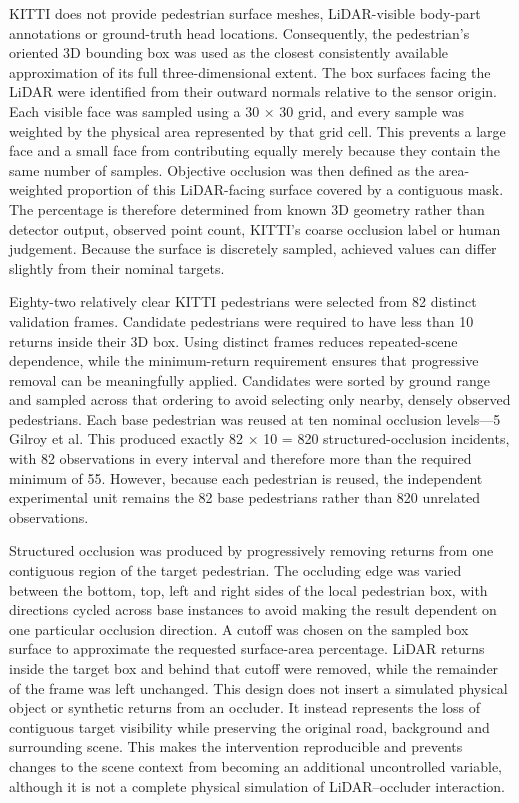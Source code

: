  KITTI does not provide pedestrian surface meshes, LiDAR-visible body-part annotations or ground-truth head
 locations. Consequently, the pedestrian’s oriented 3D bounding box was used as the closest consistently available
 approximation of its full three-dimensional extent. The box surfaces facing the LiDAR were identified from their
 outward normals relative to the sensor origin. Each visible face was sampled using a 30 × 30 grid, and every sample
 was weighted by the physical area represented by that grid cell. This prevents a large face and a small face from
 contributing equally merely because they contain the same number of samples. Objective occlusion was then defined as
 the area-weighted proportion of this LiDAR-facing surface covered by a contiguous mask. The percentage is therefore
 determined from known 3D geometry rather than detector output, observed point count, KITTI’s coarse occlusion label
 or human judgement. Because the surface is discretely sampled, achieved values can differ slightly from their
 nominal targets.

 Eighty-two relatively clear KITTI pedestrians were selected from 82 distinct validation frames. Candidate
 pedestrians were required to have less than 10%
 returns inside their 3D box. Using distinct frames reduces repeated-scene dependence, while the minimum-return
 requirement ensures that progressive removal can be meaningfully applied. Candidates were sorted by ground range and
 sampled across that ordering to avoid selecting only nearby, densely observed pedestrians. Each base pedestrian was
 reused at ten nominal occlusion levels—5%
 Gilroy et al. This produced exactly 82 × 10 = 820 structured-occlusion incidents, with 82 observations in every
 interval and therefore more than the required minimum of 55. However, because each pedestrian is reused, the
 independent experimental unit remains the 82 base pedestrians rather than 820 unrelated observations.

 Structured occlusion was produced by progressively removing returns from one contiguous region of the target
 pedestrian. The occluding edge was varied between the bottom, top, left and right sides of the local pedestrian box,
 with directions cycled across base instances to avoid making the result dependent on one particular occlusion
 direction. A cutoff was chosen on the sampled box surface to approximate the requested surface-area percentage.
 LiDAR returns inside the target box and behind that cutoff were removed, while the remainder of the frame was left
 unchanged. This design does not insert a simulated physical object or synthetic returns from an occluder. It instead
 represents the loss of contiguous target visibility while preserving the original road, background and surrounding
 scene. This makes the intervention reproducible and prevents changes to the scene context from becoming an
 additional uncontrolled variable, although it is not a complete physical simulation of LiDAR–occluder interaction.

